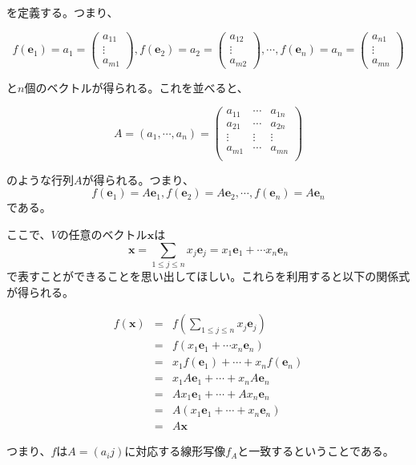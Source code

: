 \documentclass[dvipdfmx,autodetect-engine]{jsarticle}
\begin{document}
を定義する。つまり、

$$
f(\bm{e}_1) = a_1 = \begin{pmatrix}
a_{11} \\
\vdots \\
a_{m1}
\end{pmatrix}, 
f(\bm{e}_2) = a_2 = \begin{pmatrix}
a_{12} \\
\vdots \\
a_{m2}
\end{pmatrix}, 
\cdots,
f(\bm{e}_n) = a_n = \begin{pmatrix}
a_{n1} \\
\vdots \\
a_{mn}
\end{pmatrix}
$$

と$n$個のベクトルが得られる。これを並べると、

$$
A = (a_1, \cdots, a_n) = 
\begin{pmatrix}
a_{11} & \cdots & a_{1n} \\
a_{21} & \cdots & a_{2n} \\
\vdots & \vdots & \vdots \\
a_{m1} & \cdots & a_{mn} \\
\end{pmatrix}
$$

のような行列$A$が得られる。つまり、
$$
f(\bm{e}_1) = A\bm{e}_1, f(\bm{e}_2) = A\bm{e}_2, \cdots, f(\bm{e}_n) = A\bm{e}_n
$$
である。

ここで、$V$の任意のベクトル$\bm{x}$は
$$
\bm{x} = \sum_{1 \leq j \leq n} x_{j}\bm{e}_j = x_1\bm{e}_1 + \cdots x_n\bm{e}_n
$$で表すことができることを思い出してほしい。これらを利用すると以下の関係式が得られる。

\begin{eqnarray*}
f(\bm{x}) &= &f(\sum_{1 \leq j \leq n} x_{j}\bm{e}_j)  \\
&= &f(x_1\bm{e}_1 + \cdots x_n\bm{e}_n) \\
&= &x_1f(\bm{e}_1) + \cdots + x_nf(\bm{e}_n) \\
&= &x_1A\bm{e}_1 + \cdots + x_nA\bm{e}_n \\
&= &Ax_1\bm{e}_1 + \cdots + Ax_n\bm{e}_n \\
&= &A(x_1\bm{e}_1 + \cdots + x_n\bm{e}_n) \\
&= &A\bm{x}
\end{eqnarray*}

つまり、$f$は$A = (a_ij)$に対応する線形写像$f_A$と一致するということである。
\end{document}
